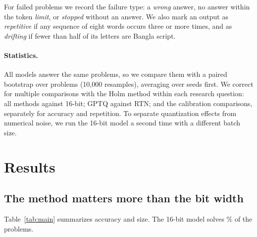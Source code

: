 \documentclass[11pt]{article}
\begin{document}
For failed problems we record the failure type: a \emph{wrong} answer, no answer within the token \emph{limit}, or \emph{stopped} without an answer. We also mark an output as \emph{repetitive} if any sequence of eight words occurs three or more times, and as \emph{drifting} if fewer than half of its letters are Bangla script.

\paragraph{Statistics.}
All models answer the same problems, so we compare them with a paired bootstrap over problems \citep{koehn2004significance} (10,000 resamples), averaging over seeds first. We correct for multiple comparisons with the Holm method within each research question: all methods against 16-bit; GPTQ against RTN; and the calibration comparisons, separately for accuracy and repetition. To separate quantization effects from numerical noise, we run the 16-bit model a second time with a different batch size.

\section{Results}

\begin{table}[t]
\centering
\small
{}
\caption{Accuracy and size on \NumEval{} held-out Bangla math problems. 4-bit GPTQ rows are mean~$\pm$~std over \NumSeeds{} calibration seeds. $\Delta$: paired-bootstrap difference; * = significant after Holm correction over the ten comparisons with 16-bit. Lost / gained: share of problems solved by 16-bit that the quantized model fails, and share of 16-bit failures it solves.}
\label{tab:main}
\end{table}

\subsection{The method matters more than the bit width}

Table~\ref{tab:main} summarizes accuracy and size. The 16-bit model solves \RefAcc\% of the problems.
\end{document}
